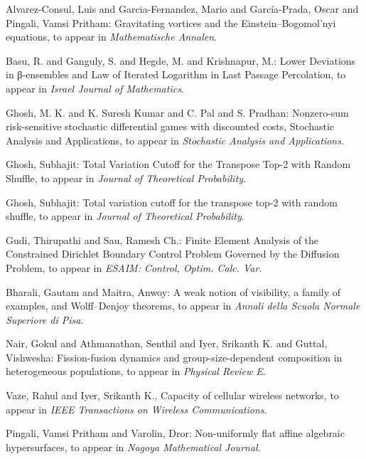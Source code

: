 \item Alvarez-Consul, Luis and Garcia-Fernandez, Mario  and García-Prada, Oscar and Pingali, Vamsi Pritham: Gravitating vortices and the Einstein–Bogomol’nyi equations, to appear in \emph{Mathematische Annalen}.

\item Basu, R. and Ganguly, S. and Hegde, M. and Krishnapur, M.: Lower Deviations in β-ensembles and Law of Iterated Logarithm in Last Passage Percolation, to appear in \emph{Israel Journal of Mathematics}.

\item Ghosh, M. K. and K. Suresh Kumar and C. Pal and S. Pradhan: Nonzero-sum risk-sensitive stochastic differential games with discounted costs, Stochastic Analysis and Applications, to appear in \emph{Stochastic Analysis and Applications}.

\item Ghosh, Subhajit: Total Variation Cutoff for the Transpose Top-2 with Random Shuffle, to appear in \emph{Journal of Theoretical Probability}.

\item Ghosh, Subhajit: Total variation cutoff for the transpose top-2 with random shuffle, to appear in {\em Journal of Theoretical Probability}.

\item Gudi, Thirupathi and  Sau, Ramesh Ch.: Finite Element Analysis of the Constrained Dirichlet Boundary Control Problem Governed by the Diffusion Problem, to appear in \emph{ESAIM: Control, Optim. Calc. Var}.

\item \label{bharali:Wolff-Denjoy} Bharali, Gautam and Maitra, Anwoy: A weak notion of visibility,
      a family of examples, and Wolff--Denjoy theorems, to appear in \emph{Annali della Scuola Normale Superiore di Pisa}.

\item \label{iyer:heterogeneous-populations} Nair, Gokul and Athmanathan, Senthil and Iyer, Srikanth K. and Guttal, Vishwesha: Fission-fusion dynamics and group-size-dependent composition in heterogeneous populations,
      to appear in {\em Physical Review E}.

\item \label{iyer:wireless-networks} Vaze, Rahul and Iyer, Srikanth K., Capacity of cellular wireless networks,
      to appear in {\em IEEE Transactions on Wireless Communications}.

\item \label{pingali:algebraic-hypersurfaces} Pingali, Vamsi Pritham and Varolin, Dror: Non-uniformly flat affine algebraic hypersurfaces, to appear in {\em Nagoya Mathematical Journal}.

